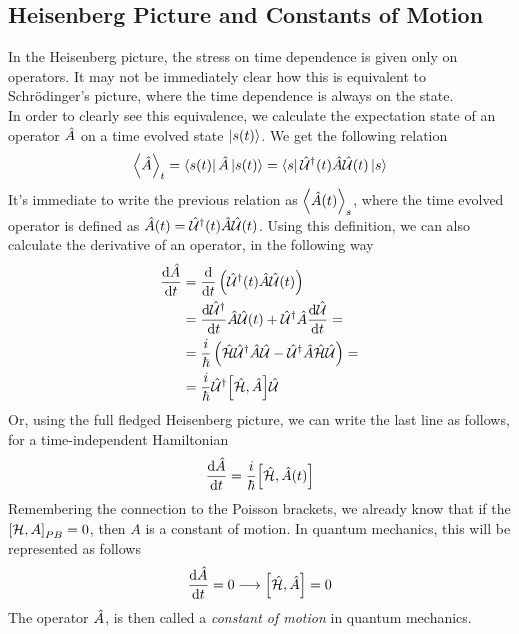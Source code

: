 \documentclass[../qm.tex]{subfiles}
\begin{document}
	\subsection{Heisenberg Picture and Constants of Motion}
	In the Heisenberg picture, the stress on time dependence is given only on operators. It may not be immediately clear how this is equivalent to Schrödinger's picture, where the time dependence is always on the state.\\
	In order to clearly see this equivalence, we calculate the expectation state of an operator $\hat{A}$ on a time evolved state $\ket{s(t)}$. We get the following relation
	\begin{equation}
		\expval{\hat{A}}_t=\bra{s(t)}\hat{A}\ket{s(t)}=\bra{s}\hat{\mathcal{U}}^{\dagger}(t)\hat{A}\hat{\mathcal{U}}(t)\ket{s}
		\label{eq:timeevolvedexpval}
	\end{equation}
	It's immediate to write the previous relation as $\expval{\hat{A}(t)}_s$, where the time evolved operator is defined as $\hat{A}(t)=\hat{\mathcal{U}}^{\dagger}(t)\hat{A}\hat{\mathcal{U}}(t)$. Using this definition, we can also calculate the derivative of an operator, in the following way
	\begin{equation}
		\begin{aligned}
			\derivative{\opr{A}}{t}&=\derivative{t}\left( \adj{\Ut}(t)\opr{A}\Ut(t) \right)\\
			&=\derivative{\adj{\Ut}}{t}\opr{A}\Ut(t)+\adj{\Ut}\opr{A}\derivative{\Ut}{t}=\\
			&=\frac{i}{\hbar}\left( \opr{\ham}\adj{\Ut}\opr{A}\Ut-\adj{\Ut}\opr{A}\opr{\ham}\Ut \right)=\\
			&=\frac{i}{\hbar}\adj{\Ut}\comm{\opr{\ham}}{\opr{A}}\Ut
		\end{aligned}
		\label{eq:timederop}
	\end{equation}
	Or, using the full fledged Heisenberg picture, we can write the last line as follows, for a time-independent Hamiltonian
	\begin{equation}
		\derivative{\opr{A}}{t}=\frac{i}{\hbar}\comm{\opr{\ham}}{\opr{A}(t)}
		\label{eq:oprder}
	\end{equation}
	Remembering the connection to the Poisson brackets, we already know that if the $\pcomm{\ham}{A}=0$, then $A$ is a constant of motion. In quantum mechanics, this will be represented as follows
	\begin{equation}
		\derivative{\opr{A}}{t}=0\longrightarrow\comm{\opr{\ham}}{\opr{A}}=0
		\label{eq:constantofmotion}
	\end{equation}
	The operator $\hat{A}$, is then called a \textit{constant of motion} in quantum mechanics.
\end{document}
